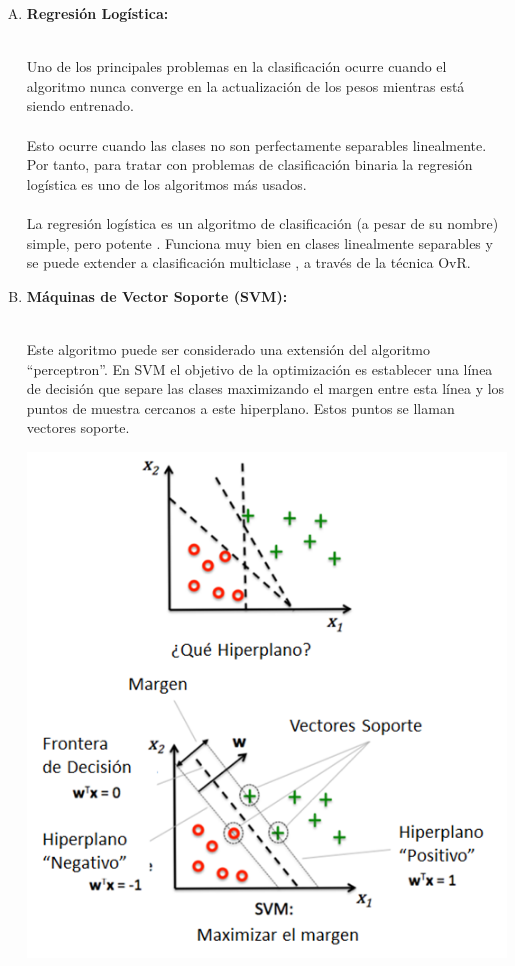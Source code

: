 \documentclass[11pt,a4paper]{article}
\begin{document}
	        \begin{enumerate}[A.]
		
			\item \textbf{Regresión Logística:}
			
			\\Uno de los principales problemas en la clasificación ocurre cuando el algoritmo nunca converge en la actualización de los pesos mientras está siendo entrenado.\\
            
            \\Esto ocurre cuando las clases no son perfectamente separables linealmente. Por tanto, para tratar con problemas de clasificación binaria la regresión logística es uno de los algoritmos más usados.\\
            
            \\La regresión logística es un algoritmo de clasificación (a pesar de su nombre) simple, pero potente . Funciona muy bien en clases linealmente separables y se puede extender a clasificación multiclase , a través de la técnica OvR.\\
			
			\item \textbf{Máquinas de Vector Soporte (SVM):}
			
			\\Este algoritmo puede ser considerado una extensión del algoritmo “perceptron”. En SVM el objetivo de la optimización es establecer una línea de decisión que separe las clases maximizando el margen entre esta línea y los puntos de muestra cercanos a este hiperplano. Estos puntos se llaman vectores soporte.\\
			
			\begin{center}
		    \includegraphics[scale=0.7]{./Imagenes/SVM}
		    \end{center}

			\end{enumerate}
	    
\end{document}
